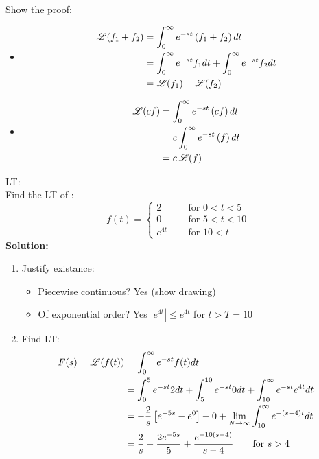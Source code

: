 Show the proof:
\begin{itemize}
\item 
\begin{align*}
\operatorname{\mathscr{L}} (f_1+f_2)&=\int^\infty_0 e^{-st}\left(f_1+f_2\right) dt\\
&=\int^\infty_0 e^{-st}f_1 dt+\int^\infty_0 e^{-st}f_2 dt\\
&=\operatorname{\mathscr{L}}(f_1)+\operatorname{\mathscr{L}}(f_2)
\end{align*}
\item 

\begin{align*}
\operatorname{\mathscr{L}} (cf)&=\int^\infty_0 e^{-st}\left(cf\right) dt\\
&=c\int^\infty_0 e^{-st}\left(f\right) dt\\
&=c\operatorname{\mathscr{L}}(f)
\end{align*}
\end{itemize}


\begin{exmp}{LT:}\\
Find the LT of :
\begin{equation*}
f(t)=
\begin{cases}
   2 \qquad &\text{for } 0<t<5\\
   0  &\text{for } 5<t<10 \\
   e^{4t} &\text{for } 10<t
\end{cases}
\end{equation*}
\textbf{Solution:}\\
\begin{enumerate}
\item Justify existance:
\begin{itemize}
\item Piecewise continuous? Yes (show drawing)
\item Of exponential order? Yes $\left|e^{4t}\right|\leq e^{4t}$ for $t>T=10$
\end{itemize}
\item Find LT:\\
\begin{align*}
F(s)=\operatorname{\mathscr{L}}(f(t))&=\int^\infty_0e^{-st}f(t) dt\\
&=\int^5_0e^{-st}2dt+\int^{10}_5 e^{-st} 0 dt + \int^\infty_{10} e^{-st} e^{4t}dt\\
&=-\frac{2}{s}\left[e^{-5s}-e^{0}\right]+0+\lim_{N\rightarrow \infty} \int^\infty_{10} e^{-(s-4)t}dt\\
&=\frac{2}{s}-\frac{2e^{-5s}}{5}+ \frac{e^{-10(s-4)}}{s-4} \qquad \text{for }s>4\\
\end{align*}

\end{enumerate}
\end{exmp}
